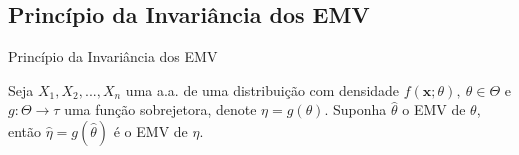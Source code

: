 \documentclass[12pt]{beamer}
\begin{document}
%

\subsection{Princípio da Invariância dos EMV}
\begin{frame}{Princípio da Invariância dos EMV}
\begin{Teorema}\label{Teo2}
\justifying
Seja $X_1, X_2, ..., X_n$ uma a.a. de uma distribuição com densidade $f(\boldsymbol{x};\theta),~\theta \in \Theta$ e $g: \Theta\rightarrow \tau$ uma função sobrejetora, denote $\eta=g(\theta).$ Suponha $\hat{\theta}$ o EMV de $\theta$, então $\hat{\eta}=g(\hat{\theta})$ é o EMV de $\eta.$
\end{Teorema}
\end{frame}
\end{document}
